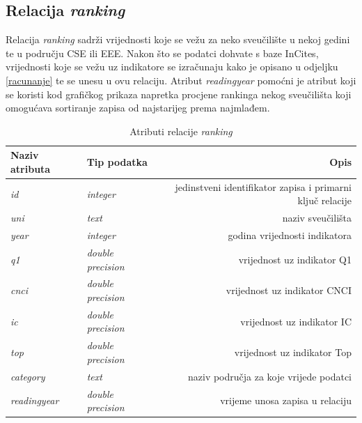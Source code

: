 \documentclass[times, utf8, zavrsni]{fer}
\begin{document}
\subsection{Relacija \emph{ranking}}
Relacija \emph{ranking} sadrži vrijednosti koje se vežu za neko sveučilište u nekoj gedini te u području CSE ili EEE. 
Nakon što se podatci dohvate s baze InCites, vrijednosti koje se vežu uz indikatore se izračunaju kako je opisano u odjeljku \ref{racunanje} 
te se unesu u ovu relaciju. Atribut \emph{readingyear} pomoćni je atribut koji se koristi kod grafičkog prikaza napretka procjene rankinga 
nekog sveučilišta koji omogućava sortiranje zapisa od najstarijeg prema najmlađem.
\begin{table}[htb]
    \caption{Atributi relacije \emph{ranking}}
        \label{tbl:ranking}
        \centering
        \begin{tabular}{llr} \hline
        Naziv atributa & Tip podatka & Opis\\ \hline
        \emph{id} &  \emph{integer} & jedinstveni identifikator zapisa i primarni ključ relacije\\
        \emph{uni} &  \emph{text} & naziv sveučilišta\\
        \emph{year} &  \emph{integer} & godina vrijednosti indikatora\\
        \emph{q1} &  \emph{double precision} & vrijednost uz indikator Q1\\
        \emph{cnci} &  \emph{double precision} & vrijednost uz indikator CNCI\\
        \emph{ic} &  \emph{double precision} & vrijednost uz indikator IC\\
        \emph{top} &  \emph{double precision} & vrijednost uz indikator Top\\
        \emph{category} &  \emph{text} & naziv područja za koje vrijede podatci\\
        \emph{readingyear} &  \emph{double precision} & vrijeme unosa zapisa u relaciju\\
        \end{tabular}
        \end{table}    
        \FloatBarrier 
\end{document}
